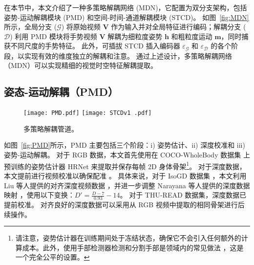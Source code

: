 在本节中，本文介绍了一种多策略解耦网络 (MDN)，它配置为双分支架构，包括姿势-运动解耦模块 (PMD) 和空间-时间-通道解耦模块 (STCD)。
如图~\ref{fig:MDN} 所示，全局分支 ($\mathcal{G}$) 将原始视频 $\mathbf{V}$ 作为输入并对全局特征进行编码；解耦分支 ($\mathcal{D}$) 利用 PMD 模块将手势视频 $\mathbf{V}$ 解耦为细粒度姿势 $\mathbf{h}$ 和粗粒度运动 $\mathbf{m}$，同时捕获不同尺度的手势特征。
此外，可插拔 STCD 插入编码器 $\varepsilon_{\mathcal{G}}$ 和 $\varepsilon_{\mathcal{D}}$ 的各个阶段，以实现有效的维度独立的解耦和注意。
通过上述设计，多策略解耦网络（MDN）可以实现精细的视觉时空特征解耦提取。

\subsection{姿态-运动解耦（PMD）}
\label{sec:pose-motion}
\begin{figure}[tb]
\centering
{}
{\texttt{[image: PMD.pdf]}}
{\texttt{[image: STCDv1 .pdf]}}
\caption{多策略解耦管道。}
\label{fig:handdecomp}
\end{figure}

如图~\ref{fig:PMD}所示，PMD 主要包括三个阶段：i) 姿势估计、ii) 深度校准和 iii) 姿势-运动解耦。
对于 RGB 数据，本文首先使用在 COCO-WholeBody 数据集 \cite{jin2020whole} 上预训练的姿势估计器 HRNet \cite{sun2019deep} 来提取并保存每帧 2D 身体骨架\footnote{请注意，姿势估计器在训练期间处于冻结状态，确保它不会引入任何额外的计算成本。此外，使用手部检测器检测和分割手部是领域内的常见做法 \cite{AVOLA2022108762,zhou2021regional,chen2022multi}，这是一个完全公平的设置。}。
对于深度数据，本文提前进行视频校准以确保配准 \cite{liu2017continuous}。
具体来说，对于 IsoGD 数据集 \cite{wan2016chalearn}，本文利用 Liu 等人提供的对齐深度视频数据 \cite{liu2017continuous}，并进一步调整 Narayana 等人提供的深度数据映射 \cite{narayana2018focus}，使用以下变换：$D'=\frac{D-7}{0.93}-14$。
对于 THU-READ 数据集，深度数据已提前校准。
对齐良好的深度数据可以采用从 RGB 视频中提取的相同骨架进行后续操作。


